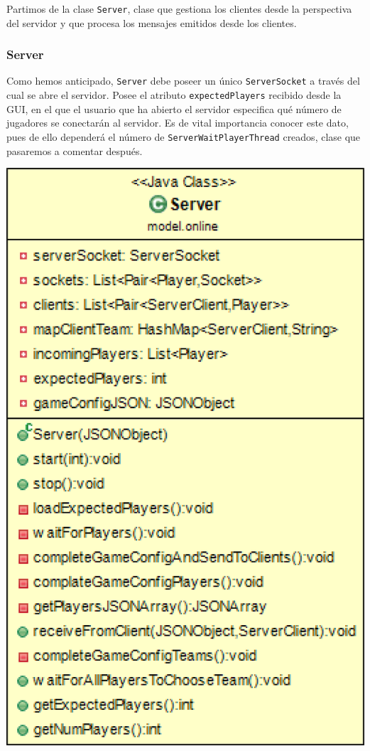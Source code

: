\documentclass[../DocumentoOficial.tex]{subfiles}
\begin{document}
Partimos de la clase \texttt{Server}, clase que gestiona los clientes desde la perspectiva del servidor y que procesa los mensajes emitidos desde los clientes.

\newpage

\subsubsection{Server}
Como hemos anticipado, \texttt{Server} debe poseer un único \texttt{ServerSocket} a través del cual se abre el servidor. Posee el atributo \texttt{expectedPlayers} recibido desde la GUI, en el que el usuario que ha abierto el servidor especifica qué número de jugadores se conectarán al servidor. Es de vital importancia conocer este dato, pues de ello dependerá el número de \texttt{ServerWaitPlayerThread} creados, clase que pasaremos a comentar después.

\begin{center}
\includegraphics[scale=0.27]{Server-sprint7.png} 
\end{center}
\end{document}
